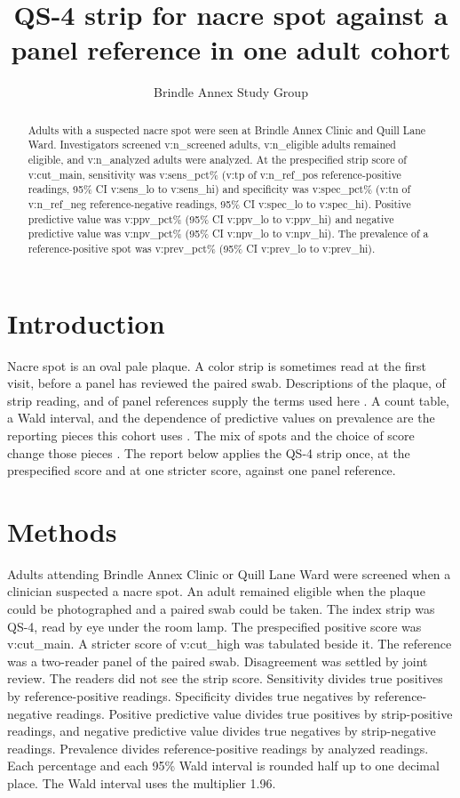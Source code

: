 \documentclass[11pt]{article}
\begin{document}
\title{QS-4 strip for nacre spot against a panel reference in one adult cohort}
\author{Brindle Annex Study Group}
\maketitle
\begin{abstract}
Adults with a suspected nacre spot were seen at Brindle Annex Clinic and Quill Lane Ward.
Investigators screened {{v:n_screened}} adults, {{v:n_eligible}} adults remained eligible, and {{v:n_analyzed}} adults were analyzed.
At the prespecified strip score of {{v:cut_main}}, sensitivity was {{v:sens_pct}}\%
({{v:tp}} of {{v:n_ref_pos}} reference-positive readings, 95\% CI {{v:sens_lo}} to {{v:sens_hi}})
and specificity was {{v:spec_pct}}\%
({{v:tn}} of {{v:n_ref_neg}} reference-negative readings, 95\% CI {{v:spec_lo}} to {{v:spec_hi}}).
Positive predictive value was {{v:ppv_pct}}\% (95\% CI {{v:ppv_lo}} to {{v:ppv_hi}})
and negative predictive value was {{v:npv_pct}}\% (95\% CI {{v:npv_lo}} to {{v:npv_hi}}).
The prevalence of a reference-positive spot was {{v:prev_pct}}\% (95\% CI {{v:prev_lo}} to {{v:prev_hi}}).
\end{abstract}
\section{Introduction}
Nacre spot is an oval pale plaque. A color strip is sometimes read at the first visit, before a panel has reviewed the paired swab.
Descriptions of the plaque, of strip reading, and of panel references supply the terms used here \cite{brindle2016,quill2018,moth2019}.
A count table, a Wald interval, and the dependence of predictive values on prevalence are the reporting pieces this cohort uses \cite{pavelic2019,halden2017,orrin2020}.
The mix of spots and the choice of score change those pieces \cite{keel2021,wynn2015}.
The report below applies the QS-4 strip once, at the prespecified score and at one stricter score, against one panel reference.
\section{Methods}
Adults attending Brindle Annex Clinic or Quill Lane Ward were screened when a clinician suspected a nacre spot.
An adult remained eligible when the plaque could be photographed and a paired swab could be taken.
The index strip was QS-4, read by eye under the room lamp. The prespecified positive score was {{v:cut_main}}.
A stricter score of {{v:cut_high}} was tabulated beside it.
The reference was a two-reader panel of the paired swab. Disagreement was settled by joint review. The readers did not see the strip score.
Sensitivity divides true positives by reference-positive readings.
Specificity divides true negatives by reference-negative readings.
Positive predictive value divides true positives by strip-positive readings, and negative predictive value divides true negatives by strip-negative readings.
Prevalence divides reference-positive readings by analyzed readings.
Each percentage and each 95\% Wald interval is rounded half up to one decimal place.
The Wald interval uses the multiplier 1.96.
\end{document}
